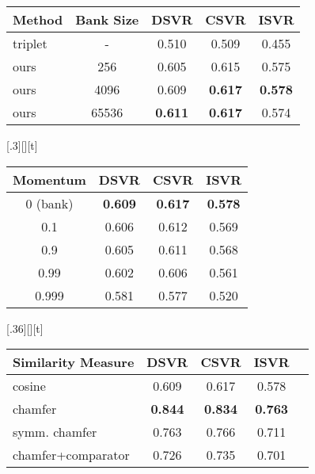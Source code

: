 \documentclass[10pt,twocolumn,letterpaper]{article}
\begin{document}
\begin{table*}[t]
{\begin{subfloatrow}
{\begin{tabular}{lcccc}
    Method  & Bank Size & DSVR              & CSVR              & ISVR   \\
    \toprule
    triplet & -         & 0.510             & 0.509             & 0.455 \\
    ours    & 256       & 0.605             & 0.615             & 0.575 \\    
    ours    & 4096      & 0.609             & \textbf{0.617}    & \textbf{0.578} \\
    ours    & 65536     & \textbf{0.611}    & \textbf{0.617}    & 0.574 \\ 
    \end{tabular}
}
[.3\textwidth][\FBheight][t]{\caption{\textbf{Momentum} (mAP on FIVR-5K)} \label{subtab:momentum}}{
    \centering
    \setlength{\tabcolsep}{2pt}
    \begin{tabular}{cccc}
    Momentum    & DSVR              & CSVR              & ISVR   \\
    \toprule
    0 (bank)    & \textbf{0.609}    & \textbf{0.617}    & \textbf{0.578} \\    
    0.1         & 0.606             & 0.612             & 0.569          \\
    0.9         & 0.605             & 0.611             & 0.568          \\ 
    0.99        & 0.602             & 0.606             & 0.561          \\ 
    0.999       & 0.581             & 0.577             & 0.520          \\
    \end{tabular}
}
[.36\textwidth][\FBheight][t]{\caption{\textbf{Similarity Measure} (mAP on FIVR-5K)} \label{subtab:simmeasure}}{
    \centering
    \setlength{\tabcolsep}{2pt}
    \begin{tabular}{lcccc}
    Similarity Measure  & DSVR              & CSVR              & ISVR   \\
    \toprule
    cosine              & 0.609          & 0.617          & 0.578          \\
    chamfer             & \textbf{0.844} & \textbf{0.834} & \textbf{0.763} \\
    symm. chamfer       & 0.763          & 0.766          & 0.711          \\
    chamfer+comparator  & 0.726          & 0.735          & 0.701          \\
    \end{tabular}
}
\end{subfloatrow}}
{\caption{\textbf{Ablations on FIVR about:} (a): Temporal context aggregation methods; (b): Frame feature representations; (c): Loss functions for contrastive learning ($\gamma=1/\tau$); (d) Size of the memory bank; (e) Momentum parameter of the queue of MoCo~\cite{he2019momentum}, degenerate to memory bank when set to 0; (f) Similarity measures (video-level and frame-level), comparator: the comparator network used in $\text{ViSiL}_{v}$~\cite{kordopatis2019visil}, with original parameters retained.} \label{tab:ablation}}
\end{table*}
\end{document}
